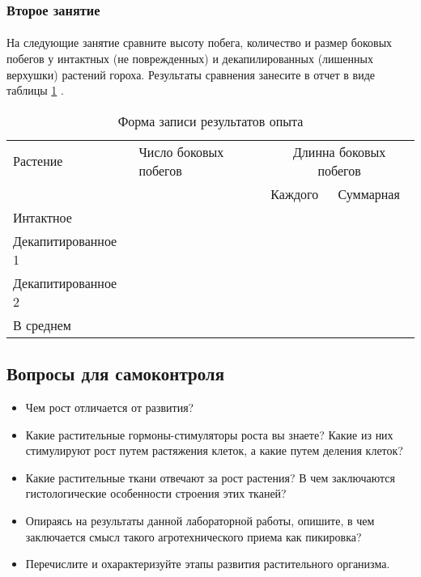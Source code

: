 	\subsubsection*{Второе занятие}
	
	\paragraph*{}На следующие занятие сравните высоту побега, количество и размер боковых побегов у интактных (не поврежденных) и декапилированных (лишенных верхушки) растений гороха. Результаты сравнения занесите в отчет в виде таблицы \ref{growth_results_table} \cite{tretiakow_fzr}. 
	
\begin{table}
\label{growth_results_table}
\caption{Форма записи результатов опыта}
\begin{tabularx}{\linewidth}{|X|X|X|X|}
\hline	\multirow{1}{*}{Растение}	&	\multirow{1}{*}{Число боковых побегов}	&	\multicolumn{2}{|c|}{Длинна боковых побегов} \\ \cline{3-4}
								&		                                    &	Каждого                     &	Суммарная	\\ 
\hline	Интактное	&	 	&	 	&		\\
\hline	Декапитированное 1	&	 	&	 	&		\\
\hline	Декапитированное 2	&	 	&	 	&		\\
\hline	В среднем	&	 	&	 	&		\\
\hline								
\end{tabularx}
\end{table}
	
\subsection*{Вопросы для самоконтроля}

\begin{itemize}
	\item Чем рост отличается от развития?
	\item Какие растительные гормоны-стимуляторы роста вы знаете? Какие из них стимулируют рост путем растяжения клеток, а какие путем деления клеток?
	\item Какие растительные ткани отвечают за рост растения? В чем заключаются гистологические особенности строения этих тканей?
	\item Опираясь на результаты данной лабораторной работы, опишите, в чем заключается смысл такого агротехнического приема как пикировка?
	\item Перечислите и охарактеризуйте этапы развития растительного организма.
\end{itemize}
	
